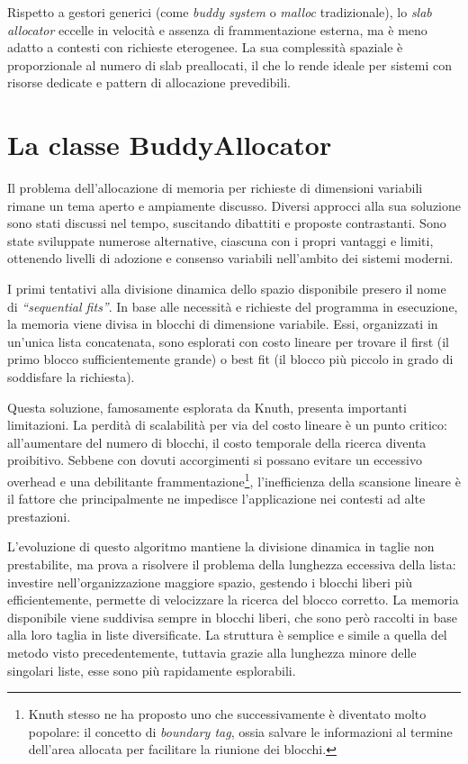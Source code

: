 Rispetto a gestori generici (come \textit{buddy system} o \textit{malloc} tradizionale), lo \textit{slab allocator} eccelle in velocità e assenza di frammentazione esterna, ma è meno adatto a contesti con richieste eterogenee. La sua complessità spaziale è proporzionale al numero di slab preallocati, il che lo rende ideale per sistemi con risorse dedicate e pattern di allocazione prevedibili.

\section{La classe BuddyAllocator}
Il problema dell’allocazione di memoria per richieste di dimensioni variabili rimane un tema aperto e ampiamente discusso. Diversi approcci alla sua soluzione sono stati discussi nel tempo, suscitando dibattiti e proposte contrastanti. Sono state sviluppate numerose alternative, ciascuna con i propri vantaggi e limiti, ottenendo livelli di adozione e consenso variabili nell'ambito dei sistemi moderni.

I primi tentativi alla divisione dinamica dello spazio disponibile presero il nome di \textit{“sequential fits”}. In base alle necessità e richieste del programma in esecuzione, la memoria viene divisa in blocchi di dimensione variabile. Essi, organizzati in un'unica lista concatenata, sono esplorati con costo lineare per trovare il first (il primo blocco sufficientemente grande) o best fit (il blocco più piccolo in grado di soddisfare la richiesta).

Questa soluzione, famosamente esplorata da Knuth, presenta importanti limitazioni. La perdità di scalabilità per via del costo lineare è un punto critico: all’aumentare del numero di blocchi, il costo temporale della ricerca diventa proibitivo. Sebbene con dovuti accorgimenti si possano evitare un eccessivo overhead e una debilitante frammentazione\footnote{Knuth stesso ne ha proposto uno che successivamente è diventato molto popolare: il concetto di \textit{boundary tag}, ossia salvare le informazioni al termine dell'area allocata per facilitare la riunione dei blocchi.}, l’inefficienza della scansione lineare è il fattore che principalmente ne impedisce l'applicazione nei contesti ad alte prestazioni.

L’evoluzione di questo algoritmo mantiene la divisione dinamica in taglie non prestabilite, ma prova a risolvere il problema della lunghezza eccessiva della lista: investire nell’organizzazione maggiore spazio, gestendo i blocchi liberi più efficientemente, permette di velocizzare la ricerca del blocco corretto. La memoria disponibile viene suddivisa sempre in blocchi liberi, che sono però raccolti in base alla loro taglia in liste diversificate. La struttura è semplice e simile a quella del metodo visto precedentemente, tuttavia grazie alla lunghezza minore delle singolari liste, esse sono più rapidamente esplorabili.

